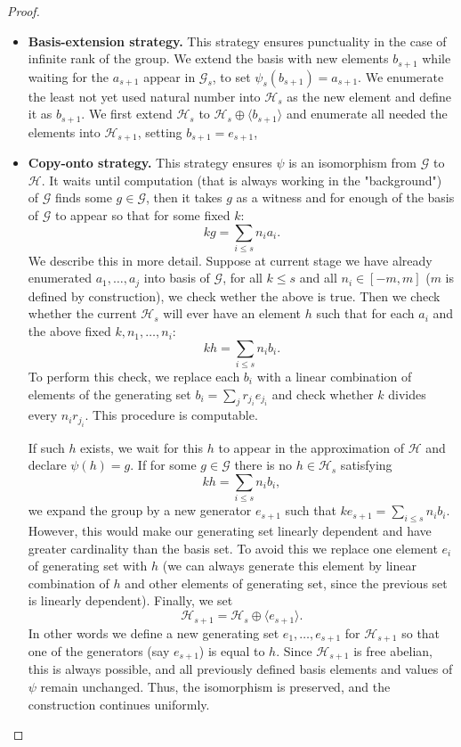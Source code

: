 \documentclass{pracalicmgr2025}
\theoremstyle{plain}            %
\theoremstyle{remark}           %
\theoremstyle{definition}       %
\begin{document}
\begin{proof}
\begin{itemize}
    \item \textbf{Basis-extension strategy.} This strategy ensures punctuality in the case of infinite rank of the group. We extend the basis with new elements $b_{s+1}$ while waiting for the $a_{s+1}$ appear in $\mathcal{G}_s$, to set $\psi_s(b_{s+1}) = a_{s+1} $. We enumerate the least not yet used natural number into $\mathcal{H}_s$ as the new element and define it as $b_{s+1}$. We first extend $\mathcal{H}_s$ to $\mathcal{H}_s \oplus \langle b_{s+1} \rangle$ and enumerate all needed the elements into $\mathcal{H}_{s+1}$, setting $b_{s+1} = e_{s+1}$,
    
    \item \textbf{Copy-onto strategy.} This strategy ensures $\psi$ is an isomorphism from $\mathcal{G}$ to $\mathcal{H}$. It waits until computation (that is always working in the "background") of $\mathcal{G}$ finds some $g\in \mathcal{G}$, then it takes $g$ as a witness and for enough of the basis of $\mathcal{G}$ to appear so that for some fixed $k$:
    $$
     k g = \sum_{i \leq s} n_i a_i.
    $$
    We describe this in more detail. Suppose at current stage we have already enumerated $a_1,\dots,a_j$ into basis of $\mathcal{G}$, for all $k \le s$ and all $n_i \in [-m, m]$ ($m$ is defined by construction), we check wether the above is true. Then we check whether the current $\mathcal{H}_s$ will ever have an element $h$ such that for each $a_i$ and the above fixed $k,n_1,\dots,n_i$:
    $$
     k h = \sum_{i \leq s} n_i b_i.
    $$
    To perform this check, we replace each $b_i$ with a linear combination of elements of the generating set $b_i = \sum_j r_{j_i} e_{j_i}$ and  check whether $k$ divides every $n_i r_{j_i}$. This procedure is computable.

    
    If such $h$ exists, we wait for this $h$ to appear in the approximation of $\mathcal{H}$ and declare $\psi(h) = g$. If for some $g \in \mathcal{G}$ there is no $h \in \mathcal{H}_s$ satisfying 
        $$
        k h = \sum_{i \leq s} n_i b_i,
        $$ 
        we expand the group by a new generator $e_{s+1}$ such that $ke_{s+1} = \sum_{i \leq s} n_i b_i$. However, this would make our generating set linearly dependent and have greater cardinality than the basis set. To avoid this we replace one element $e_i$ of generating set with $h$ (we can always generate this element by linear combination of $h$ and other elements of generating set, since the previous set is linearly dependent). Finally, we set 
        $$
        \mathcal{H}_{s+1} = \mathcal{H}_s \oplus \langle e_{s+1} \rangle.
        $$
        In other words we define a new generating set $e_1, \dots, e_{s+1}$ for $\mathcal{H}_{s+1}$ so that one of the generators (say $e_{s+1}$) is equal to $h$. Since $\mathcal{H}_{s+1}$ is free abelian, this is always possible, and all previously defined basis elements and values of $\psi$ remain unchanged. Thus, the isomorphism is preserved, and the construction continues uniformly.


\end{itemize}
\end{proof}
\end{document}
